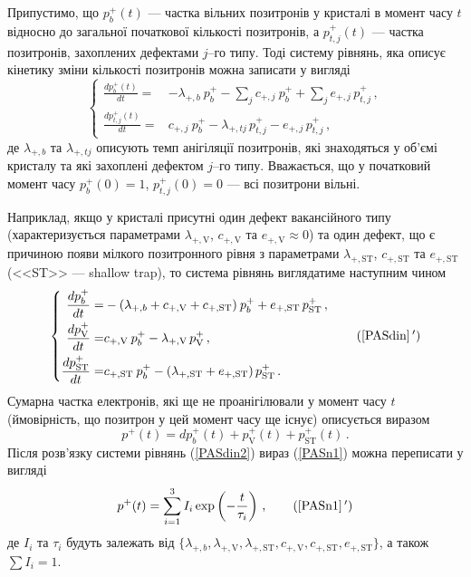 \documentclass[10pt,a5paper,titlepage,oneside]{book}
\numberwithin{equation}{part}
\begin{document}
Припустимо, що
$p_{b}^+(t)$ --- частка вільних позитронів у кристалі в момент часу $t$ відносно до загальної початкової кількості позитронів, а
$p_{t,j}^+(t)$  --- частка позитронів, захоплених дефектами $j$--го типу.
Тоді систему рівнянь, яка описує кінетику зміни кількості позитронів можна записати у вигляді
\begin{equation}\label{PASdin}
\left\{
\begin{aligned}%
\frac{dp_{b}^+(t)}{dt}=& -\lambda_{+,b} \:p_{b}^+ - \sum_j c_{+,j} \:p_{b}^+ + \sum_j e_{+,j} \,p_{t,j}^+ \,,\\
\frac{dp_{t,j}^+(t)}{dt}=& c_{+,j} \:p_{b}^+ - \lambda_{+,tj}\,p_{t,j}^+ - e_{+,j} \,p_{t,j}^+ \,,
\end{aligned} \right.
\end{equation}
де
$\lambda_{+,b}$ та $\lambda_{+,tj}$ описують темп анігіляції позитронів, які знаходяться
у об'ємі кристалу та які захоплені дефектом $j$--го  типу.
Вважається, що у початковий момент часу $p_{b}^+(0)=1$, $p_{t,j}^+(0)=0$ --- всі позитрони вільні.

Наприклад, якщо у кристалі присутні один дефект вакансійного типу
(характеризується параметрами $\lambda_{+,\mathrm{V}}$, $c_{+,\mathrm{V}}$ та $e_{+,\mathrm{V}}\approx0$)
та один дефект, що є причиною появи мілкого позитронного рівня з параметрами
$\lambda_{+,\mathrm{ST}}$, $c_{+,\mathrm{ST}}$ та $e_{+,\mathrm{ST}}$ (<<ST>> --- shallow trap),
то система рівнянь виглядатиме наступним чином
\begin{equation}\label{PASdin2}
\left\{
\begin{aligned}%
\frac{dp_{b}^+}{dt}=& -(\lambda_{+,b}+c_{+,\mathrm{V}}+c_{+,\mathrm{ST}}) \:p_{b}^+ +e_{+,\mathrm{ST}}\,p_{\mathrm{ST}}^+ \,,\\
\frac{dp_{\mathrm{V}}^+}{dt}=& c_{+,\mathrm{V}} \:p_{b}^+ - \lambda_{+,\mathrm{V}}\,p_{\mathrm{V}}^+ \,,\\
\frac{dp_{\mathrm{ST}}^+}{dt}=& c_{+,\mathrm{ST}} \:p_{b}^+ - (\lambda_{+,\mathrm{ST}}+e_{+,\mathrm{ST}})\,p_{\mathrm{ST}}^+ \,.
\end{aligned} \right.\tag{\ref{PASdin}\,$'$}
\end{equation}
Сумарна частка електронів, які ще не проанігілювали у момент часу $t$
(ймовірність, що позитрон у цей момент часу ще існує) описується виразом
\begin{equation}\label{PASn1}
p^+(t)=dp_{b}^+(t) + p_{\mathrm{V}}^+(t) + p_{\mathrm{ST}}^+(t)\,.
\end{equation}
Після розв'язку системи рівнянь (\ref{PASdin2}) вираз (\ref{PASn1})  можна
переписати у вигляді
\begin{equation}\label{PASn2}
p^+(t)=\sum_{i=1}^3I_i\exp\left(-\frac{t}{\tau_i}\right)\,,\tag{\ref{PASn1}\,$'$}
\end{equation}
де
$I_i$ та $\tau_i$ будуть залежать від $\{\lambda_{+,b},\lambda_{+,\mathrm{V}},\lambda_{+,\mathrm{ST}},c_{+,\mathrm{V}},c_{+,\mathrm{ST}},e_{+,\mathrm{ST}}\}$,
а також $\sum I_i=1$.
\end{document}
